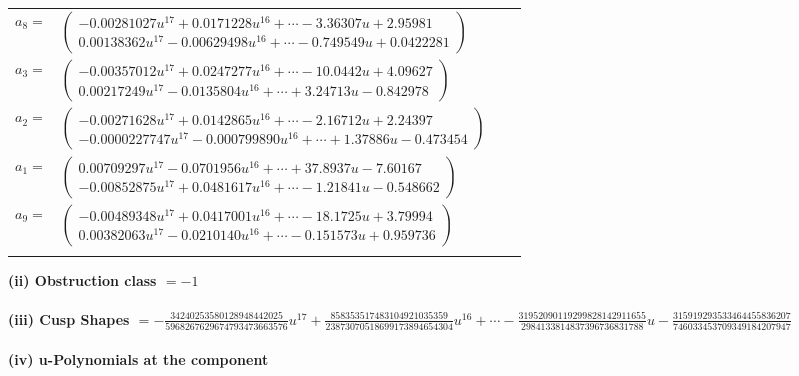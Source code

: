 \documentclass[1p]{elsarticle_modified}
\theoremstyle{definition}
\begin{document}
\begin{tabular}{m{7pt} m{180pt} m{7pt} m{180pt} }
\flushright $a_{8}=$&$\begin{pmatrix}-0.00281027 u^{17}+0.0171228 u^{16}+\cdots-3.36307 u+2.95981\\0.00138362 u^{17}-0.00629498 u^{16}+\cdots-0.749549 u+0.0422281\end{pmatrix}$ \\
\flushright $a_{3}=$&$\begin{pmatrix}-0.00357012 u^{17}+0.0247277 u^{16}+\cdots-10.0442 u+4.09627\\0.00217249 u^{17}-0.0135804 u^{16}+\cdots+3.24713 u-0.842978\end{pmatrix}$ \\
\flushright $a_{2}=$&$\begin{pmatrix}-0.00271628 u^{17}+0.0142865 u^{16}+\cdots-2.16712 u+2.24397\\-0.0000227747 u^{17}-0.000799890 u^{16}+\cdots+1.37886 u-0.473454\end{pmatrix}$ \\
\flushright $a_{1}=$&$\begin{pmatrix}0.00709297 u^{17}-0.0701956 u^{16}+\cdots+37.8937 u-7.60167\\-0.00852875 u^{17}+0.0481617 u^{16}+\cdots-1.21841 u-0.548662\end{pmatrix}$ \\
\flushright $a_{9}=$&$\begin{pmatrix}-0.00489348 u^{17}+0.0417001 u^{16}+\cdots-18.1725 u+3.79994\\0.00382063 u^{17}-0.0210140 u^{16}+\cdots-0.151573 u+0.959736\end{pmatrix}$\\&\end{tabular}
\flushleft \textbf{(ii) Obstruction class $= -1$}\\~\\
\flushleft \textbf{(iii) Cusp Shapes $= -\frac{34240253580128948442025}{5968267629674793473663576} u^{17}+\frac{858353517483104921035359}{23873070518699173894654304} u^{16}+\cdots-\frac{31952090119299828142911655}{2984133814837396736831788} u-\frac{315919293533464455836207}{746033453709349184207947}$}\\~\\
\newpage\renewcommand{\arraystretch}{1}
\flushleft \textbf{(iv) u-Polynomials at the component}\newline \\
\end{document}
